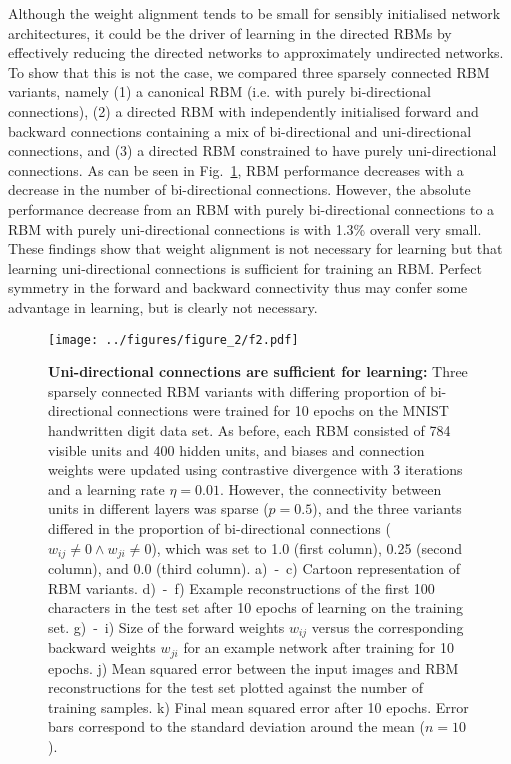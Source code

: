 \documentclass[11pt]{article}
\begin{document}
Although the weight alignment tends to be small for sensibly
initialised network architectures, it could be the driver of learning
in the directed RBMs by effectively reducing the directed networks to
approximately undirected networks. To show that this is not the case,
we compared three sparsely connected RBM variants, namely (1) a
canonical RBM (i.e. with purely bi-directional connections), (2) a
directed RBM with independently initialised forward and backward
connections containing a mix of bi-directional and uni-directional
connections, and (3) a directed RBM constrained to have purely
uni-directional connections.
As can be seen in Fig.~\ref{fig:unidirectional_connections}, RBM
performance decreases with a decrease in the number of bi-directional
connections. However, the absolute performance decrease from an RBM
with purely bi-directional connections to a RBM with purely
uni-directional connections is with 1.3\% overall very small.
These findings show that weight alignment is not necessary
for learning but that learning uni-directional connections is
sufficient for training an RBM. Perfect symmetry in the forward and
backward connectivity thus may confer some advantage in learning, but
is clearly not necessary.

\begin{figure}[H]
  \label{fig:unidirectional_connections}
  \centering
  \texttt{[image: ../figures/figure\_2/f2.pdf]}
  \caption{\footnotesize
    \textbf{Uni-directional connections are sufficient for learning:}
    Three sparsely connected RBM variants with differing proportion of bi-directional connections were trained for 10 epochs on the MNIST handwritten digit data set.
    As before, each RBM consisted of 784 visible units and 400 hidden units,
    and biases and connection weights were updated using contrastive divergence with 3 iterations and a learning rate $\eta=0.01$.
    However, the connectivity between units in different layers was sparse ($p=0.5$),
    and the three variants differed in the proportion of
    bi-directional connections ($w_{ij} \neq 0 \land w_{ji} \neq 0$),
    which was set to 1.0 (first column), 0.25 (second column), and 0.0
    (third column).
    a)~-~c) Cartoon representation of RBM variants.
    d)~-~f) Example reconstructions of the first 100 characters in the test set after 10 epochs of learning on the training set.
    g)~-~i) Size of the forward weights $w_{ij}$ versus the corresponding backward weights $w_{ji}$ for an example network after training for 10 epochs.
    j) Mean squared error between the input images and RBM reconstructions for the test set plotted against the number of training samples.
    k) Final mean squared error after 10 epochs. Error bars correspond to the standard deviation around the mean ($n = 10$).
  }
\end{figure}
\end{document}
